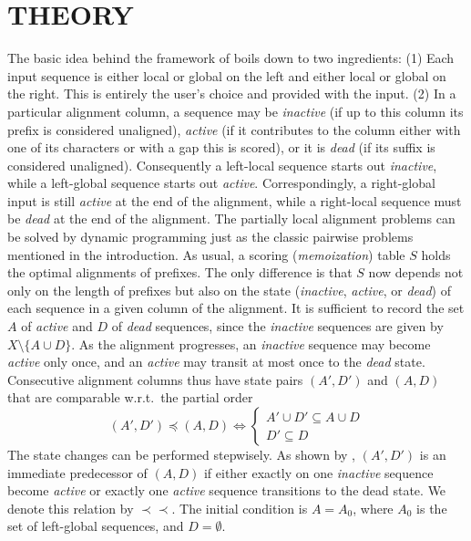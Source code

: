 \documentclass[a4paper,10pt]{article}
\newcommand{\pprec}{\mathrel{\prec\!\!\!\prec}}
\begin{document}
\section{\uppercase{Theory}}

The basic idea behind the framework of \citet{Retzlaff:18a} boils down to
two ingredients: (1) Each input sequence is either local or global on the
left and either local or global on the right. This is entirely the user's
choice and provided with the input. (2) In a particular alignment column, a
sequence may be \textit{inactive} (if up to this column its prefix is
considered unaligned), \textit{active} (if it contributes to the column
either with one of its characters or with a gap this is scored), or it is
\textit{dead} (if its suffix is considered unaligned). Consequently a
left-local sequence starts out \textit{inactive}, while a left-global
sequence starts out \textit{active}. Correspondingly, a right-global input
is still \textit{active} at the end of the alignment, while a right-local
sequence must be \textit{dead} at the end of the alignment. The partially
local alignment problems can be solved by dynamic programming just as the
classic pairwise problems mentioned in the introduction. As usual, a
scoring (\emph{memoization}) table $S$ holds the optimal alignments of
prefixes. The only difference is that $S$ now depends not only on the
length of prefixes but also on the state (\textit{inactive},
\textit{active}, or \textit{dead}) of each sequence in a given column of
the alignment. It is sufficient to record the set $A$ of \textit{active}
and $D$ of \textit{dead} sequences, since the \emph{inactive} sequences are
given by $X\setminus\{A \cup D\}$.  As the alignment progresses, an
\textit{inactive} sequence may become \textit{active} only once, and an
\textit{active} may transit at most once to the \textit{dead}
state. Consecutive alignment columns thus have state pairs $(A',D')$ and
$(A,D)$ that are comparable w.r.t.\ the partial order
\begin{equation}
  (A',D')\preceq(A,D) \iff
    \begin{cases} A'\cup D'\subseteq A\cup D \\
      D'\subseteq D
    \end{cases}
\end{equation}
The state changes can be performed stepwisely. As shown by
\citet{Retzlaff:18a}, $(A',D')$ is an immediate predecessor of $(A,D)$ if
either exactly on one \textit{inactive} sequence become \textit{active} or
exactly one \textit{active} sequence transitions to the dead state.  We
denote this relation by $\pprec$. The initial condition is $A=A_0$, where
$A_0$ is the set of left-global sequences, and $D=\emptyset$.
\end{document}
